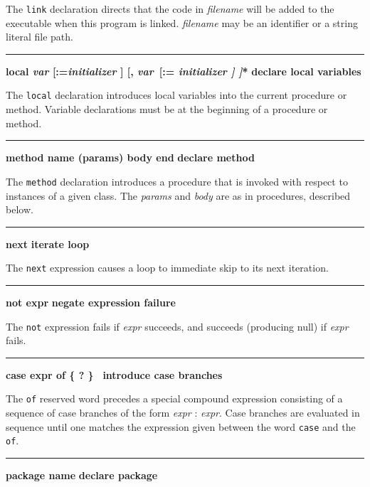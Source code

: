 \noindent
The \texttt{link} declaration directs that the code in
\textit{filename} will be added to the executable when this program is
linked. \textit{filename} may be an identifier or a string literal file
path.

\bigskip\hrule\vspace{0.1cm}
\noindent
{\bf \textbf{local} \textit{var} [:=\textit{initializer} ] [, \textit{var}\ [:=\textit{ initializer ] ]}* } \hfill {\bf declare local variables}

\noindent
{}The \texttt{local} declaration introduces local
variables into the current procedure or method.
Variable declarations must be at the beginning of a
procedure or method.

\bigskip\hrule\vspace{0.1cm}
\noindent
{\bf method name (params) body end } \hfill {\bf declare method}

\noindent
{}The \texttt{method} declaration introduces a procedure
that is invoked with respect to instances of
a given class. The \textit{params} and \textit{body}
are as in procedures, described below.

\bigskip\hrule\vspace{0.1cm}
\noindent
{\bf next } \hfill {\bf iterate loop}

\noindent
{}The \texttt{next} expression causes a loop to
immediate skip to its next iteration.

\bigskip\hrule\vspace{0.1cm}
\noindent
{\bf not expr } \hfill {\bf negate expression failure}

\noindent
{}The \texttt{not} expression fails if \textit{expr} succeeds,
and succeeds (producing null) if \textit{expr} fails.

\bigskip\hrule\vspace{0.1cm}
\noindent
{\bf case expr of \{ ? \}\ } \hfill {\bf introduce case branches}

\noindent
{}The \texttt{of} reserved word precedes a special compound
expression consisting of a sequence of case branches of the form
\textit{expr} : \textit{expr}. Case branches are evaluated in sequence
until one matches the expression given between the word
\texttt{case} and the \texttt{of}.

\bigskip\hrule\vspace{0.1cm}
\noindent
{\bf package name } \hfill {\bf declare package}


